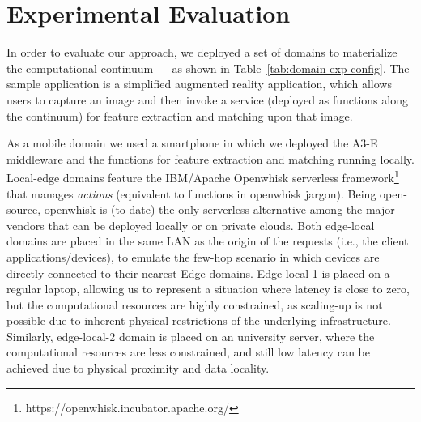 \section{Experimental Evaluation}\label{sec:evaluation}



In order to evaluate our approach, we deployed a set of domains to materialize the computational continuum --- as shown in Table~\ref{tab:domain-exp-config}. The sample application is a simplified augmented reality application, which allows users to capture an image and then invoke a service (deployed as functions along the continuum) for feature extraction and matching upon that image. 

 As a mobile domain we used a smartphone in which we deployed the A3-E middleware and the functions for feature extraction and matching running locally. Local-edge domains feature the IBM/Apache Openwhisk  serverless framework\footnote{https://openwhisk.incubator.apache.org/} that manages {\em actions} (equivalent to functions in openwhisk jargon). Being open-source, openwhisk is (to date) the only serverless alternative among the major vendors that can be deployed locally or on private clouds. 
Both edge-local domains are placed in the same LAN as the origin of the requests (i.e., the client applications/devices), to emulate the few-hop scenario in which devices are directly connected to their nearest Edge domains. Edge-local-1 is placed on a regular laptop, allowing us to represent a situation where latency is close to zero, but the computational resources are highly constrained, as scaling-up is not possible due to inherent physical restrictions of the underlying infrastructure. Similarly, edge-local-2 domain is placed on an university server, where the computational resources are less constrained, and still low latency can be achieved due to physical proximity and data locality.

